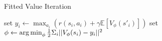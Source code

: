 \begin{algorithm}[t!]
\caption{Fitted Value Iteration}
\begin{algorithmic}[1]
\label{alg:fittedvaliter}
    \STATE set $y_i \leftarrow \max_{a_i}\left(r(s_i,a_i) + \gamma \mathbb{E}\left[V_\phi(s'_i)\right]\right)$
    \STATE set $\phi \leftarrow \operatorname*{arg\,min}_\phi \frac{1}{2}\Sigma_i\lvert|V_\phi(s_i) - y_i|\rvert^2$
\ENDWHILE
\end{algorithmic}
\end{algorithm}